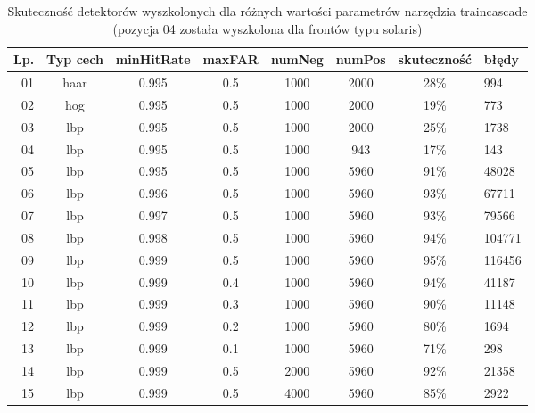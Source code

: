 \begin{table}[!h]
    \centering
    \begin{tabular}{r|c|c|c|c|c|c|l}
Lp.       & Typ cech & minHitRate & maxFAR & numNeg & numPos & skuteczność & błędy\\
          \hline
01        & haar     & 0.995      & 0.5       & 1000 & 2000 & 28\% &  994 \\
02        & hog      & 0.995      & 0.5       & 1000 & 2000 & 19\% &  773 \\
03        & lbp      & 0.995      & 0.5       & 1000 & 2000 & 25\% &  1738 \\
04        & lbp      & 0.995      & 0.5       & 1000 & 943  & 17\% &  143 \\
05        & lbp      & 0.995      & 0.5       & 1000 & 5960 & 91\% &  48028 \\
06        & lbp      & 0.996      & 0.5       & 1000 & 5960 & 93\% &  67711 \\
07        & lbp      & 0.997      & 0.5       & 1000 & 5960 & 93\% &  79566 \\
08        & lbp      & 0.998      & 0.5       & 1000 & 5960 & 94\% &  104771 \\
09        & lbp      & 0.999      & 0.5       & 1000 & 5960 & 95\% &  116456 \\
10        & lbp      & 0.999      & 0.4       & 1000 & 5960 & 94\% &  41187 \\
11        & lbp      & 0.999      & 0.3       & 1000 & 5960 & 90\% &  11148 \\
12        & lbp      & 0.999      & 0.2       & 1000 & 5960 & 80\% &  1694 \\
13        & lbp      & 0.999      & 0.1       & 1000 & 5960 & 71\% &  298 \\
14        & lbp      & 0.999      & 0.5       & 2000 & 5960 & 92\% &  21358 \\
15        & lbp      & 0.999      & 0.5       & 4000 & 5960 & 85\% &  2922 \\
    \end{tabular}                                                            
    \caption{Skuteczność detektorów wyszkolonych 
        dla różnych wartości parametrów narzędzia traincascade
        (pozycja 04 została wyszkolona dla frontów typu solaris)
    }
    \label{tab:it1detectorlist}
\end{table}

